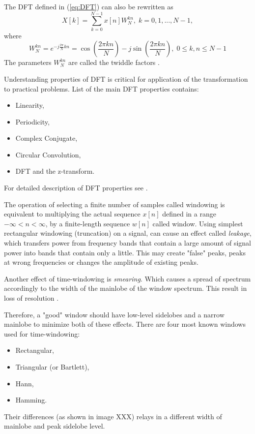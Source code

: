 \documentclass[twoside]{ctuthesis}
\theoremstyle{plain}
\theoremstyle{definition}
\theoremstyle{note}
\begin{document}
The DFT defined in (\ref{eq:DFT}) can also be rewritten as
\begin{equation} \label{eq:DFT2}
X[k]=\sum_{k=0}^{N-1}x[n]W^{kn}_{N},\; k = 0, 1, ..., N-1,
\end{equation}
where
\begin{equation} \label{eq:Twiddle}
W^{kn}_{N}=e^{-j \frac{2 \pi}{N} kn}=\cos(\frac{2\pi kn}{N})-j\sin(\frac{2\pi kn}{N}), \;0\leq k,n\leq N-1
\end{equation}
The parameters $W^{kn}_{N}$ are called the twiddle factors \cite{cite:RT_DSP}.
\par
Understanding properties of DFT is critical for application of the transformation to practical problems. List of the main DFT properties contains:
\begin{itemize}
	\setlength{\itemsep}{5pt}
\item Linearity,

\item Periodicity,

\item Complex Conjugate,

\item Circular Convolution,

\item DFT and the z-transform.
\end{itemize}
For detailed description of DFT properties see \cite{cite:2,cite:RT_DSP}.

The operation of selecting a finite number of samples called windowing is equivalent to multiplying the actual sequence $x[n]$ defined in a range $-\infty < n < \infty$, by a finite-length sequence $w[n]$ called window. Using simplest rectangular windowing (truncation) on a signal, can cause an effect called \textit{leakage}, which transfers power from frequency bands that contain a large amount of signal power into bands that contain only a little. This may create "false" peaks, peaks at wrong frequencies or changes the amplitude of existing peaks. 

Another effect of time-windowing is \textit{smearing}. Which causes a spread of spectrum accordingly to the width of the mainlobe of the window spectrum. This result in loss of resolution \cite{cite:3} .

Therefore, a "good" window should have low-level sidelobes and a narrow mainlobe to minimize both of these effects. There are four most known windows used for time-windowing: 
\begin{itemize}
	 \setlength{\itemsep}{5pt}
\item Rectangular,
	
\item Triangular (or Bartlett),
	
\item Hann,
	
\item Hamming.
\end{itemize}	
Their differences (as shown in image XXX) relays in a different width of mainlobe and peak sidelobe level.
\end{document}
